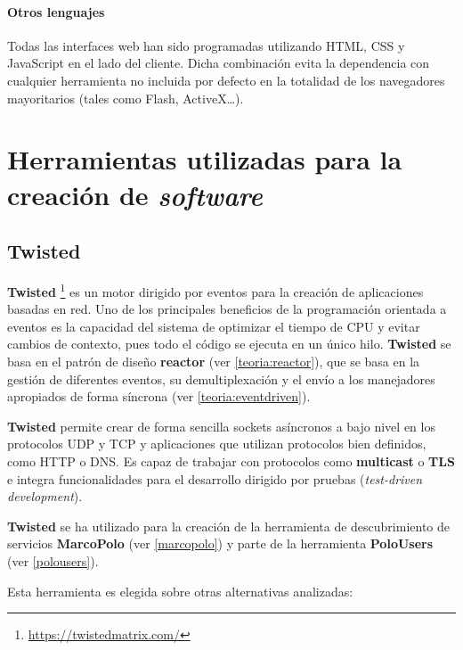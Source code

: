 \paragraph{Otros lenguajes\\}

Todas las interfaces web han sido programadas utilizando HTML, CSS y JavaScript en el lado del cliente. Dicha combinación evita la dependencia con cualquier herramienta no incluida por defecto en la totalidad de los navegadores mayoritarios (tales como Flash, ActiveX\dots).

\section{Herramientas utilizadas para la creación de \textit{software}}

\subsection{Twisted}

\textbf{Twisted} \footnote{\href{https://twistedmatrix.com/}{https://twistedmatrix.com/}} es un motor dirigido por eventos para la creación de aplicaciones basadas en red. Uno de los principales beneficios de la programación orientada a eventos es la capacidad del sistema de optimizar el tiempo de CPU y evitar cambios de contexto, pues todo el código se ejecuta en un único hilo. \textbf{Twisted} se basa en el patrón de diseño \textbf{reactor} (ver \ref{teoria:reactor}), que se basa en la gestión de diferentes eventos, su demultiplexación y el envío a los manejadores apropiados de forma síncrona (ver \ref{teoria:eventdriven}).

\textbf{Twisted} permite crear de forma sencilla sockets asíncronos a bajo nivel en los protocolos UDP y TCP y aplicaciones que utilizan protocolos bien definidos, como HTTP o DNS. Es capaz de trabajar con protocolos como \textbf{multicast} o \textbf{TLS} e integra funcionalidades para el desarrollo dirigido por pruebas (\textit{test-driven development}).

\textbf{Twisted} se ha utilizado para la creación de la herramienta de descubrimiento de servicios \textbf{MarcoPolo} (ver \ref{marcopolo}) y parte de la herramienta \textbf{PoloUsers} (ver \ref{polousers}).

Esta herramienta es elegida sobre otras alternativas analizadas:

